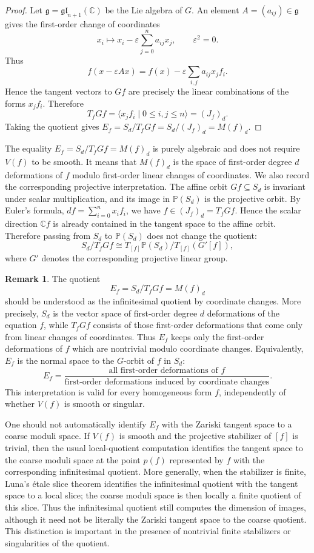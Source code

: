\documentclass[11pt]{amsart}
\theoremstyle{plain}
\theoremstyle{definition}
\newtheorem{rk}[subsection]{Remark}
\numberwithin{equation}{section}
\newcommand{\C}{\mathbb{C}}
\newcommand{\PP}{\mathbb{P}}
\begin{document}
\begin{proof}
Let $\mathfrak g=\mathfrak{gl}_{n+1}(\C)$ be the Lie algebra of $G$. An element
$A=(a_{ij})\in\mathfrak g$ gives the first-order change of coordinates
\[
x_i\longmapsto x_i-\varepsilon\sum_{j=0}^n a_{ij}x_j,
\qquad \varepsilon^2=0.
\]
Thus
\[
f(x-\varepsilon Ax)
=
f(x)-\varepsilon\sum_{i,j}a_{ij}x_jf_i.
\]
Hence the tangent vectors to $Gf$ are precisely the linear combinations of the
forms $x_jf_i$. Therefore
\[
T_fGf=\langle x_jf_i\mid 0\leq i,j\leq n\rangle=(J_f)_d.
\]
Taking the quotient gives
$E_f=S_d/T_fGf=S_d/(J_f)_d=M(f)_d$.
\end{proof}
The equality $E_f=S_d/T_fGf=M(f)_d$ is purely algebraic and does not require $V(f)$ to be smooth. It means that
$M(f)_d$ is the space of first-order degree $d$ deformations of $f$ modulo first-order linear changes of coordinates. We also record the corresponding projective interpretation. The affine orbit $Gf\subseteq S_d$ is invariant under scalar  multiplication, and its image in $\PP(S_d)$ is the projective orbit. By Euler's formula,
$df=\sum_{i=0}^n x_if_i$, we have $f\in (J_f)_d=T_fGf$. Hence the scalar direction $\C f$ is already
contained in the tangent space to the affine orbit. Therefore passing from $S_d$ to $\PP(S_d)$ does not change the quotient:
\[
S_d/T_fGf
\cong
T_{[f]}\PP(S_d)/T_{[f]}(G'[f]),
\]
where $G'$ denotes the corresponding projective linear group.

\begin{rk}
\label{rk:orbit-quotient-vs-moduli-tangent}
The quotient
\[
E_f=S_d/T_fGf=M(f)_d
\]
should be understood as the infinitesimal quotient by coordinate changes. More
precisely, $S_d$ is the vector space of first-order degree $d$ deformations of
the equation $f$, while $T_fGf$ consists of those first-order deformations that
come only from linear changes of coordinates. Thus $E_f$ keeps only the
first-order deformations of $f$ which are nontrivial modulo coordinate changes.
Equivalently, $E_f$ is the normal space to the $G$-orbit of $f$ in $S_d$:
\[
E_f=\frac{\text{all first-order deformations of }f}
{\text{first-order deformations induced by coordinate changes}}.
\]
This interpretation is valid for every homogeneous form $f$, independently of
whether $V(f)$ is smooth or singular.

One should not automatically identify $E_f$ with the Zariski tangent space to a
coarse moduli space. If $V(f)$ is smooth and the projective stabilizer of $[f]$
is trivial, then the usual local-quotient computation identifies the tangent
space to the coarse moduli space at the point $p(f)$ represented by $f$ with the
corresponding infinitesimal quotient. More generally, when the stabilizer is
finite, Luna's \'{e}tale slice theorem identifies the infinitesimal quotient
with the tangent space to a local slice; the coarse moduli space is then locally
a finite quotient of this slice. Thus the infinitesimal quotient still computes
the dimension of images, although it need not be literally the Zariski tangent
space to the coarse quotient. This distinction is important in the presence of
nontrivial finite stabilizers or singularities of the quotient.
\end{rk}
\end{document}
